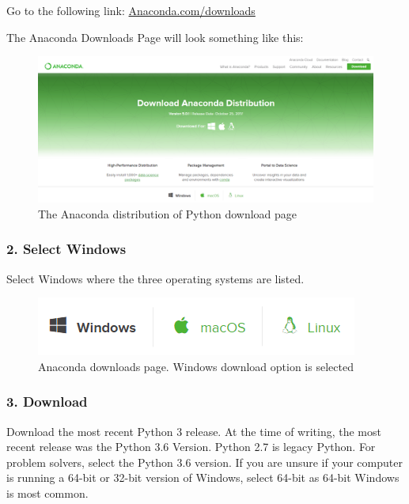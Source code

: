 \documentclass{book}
\makeatletter
\def\maxwidth{\ifdim\Gin@nat@width>\linewidth\linewidth
    \else\Gin@nat@width\fi}
\let\Oldincludegraphics\includegraphics
\renewcommand{\includegraphics}[1]{\Oldincludegraphics[width=.8\maxwidth]{#1}}
\makeatother
\begin{document}
Go to the following link:
\href{https://www.anaconda.com/download/}{Anaconda.com/downloads}

The Anaconda Downloads Page will look something like this:

\begin{figure}
\centering
\includegraphics{images/anaconda_download_page.png}
\caption{The Anaconda distribution of Python download page}
\end{figure}
    




    
        \subsubsection{2. Select Windows}\label{select-windows}

Select Windows where the three operating systems are listed.

\begin{figure}
\centering
\includegraphics{images/anaconda_select_windows.png}
\caption{Anaconda downloads page. Windows download option is selected}
\end{figure}
    




    
        \subsubsection{3. Download}\label{download}

Download the most recent Python 3 release. At the time of writing, the
most recent release was the Python 3.6 Version. Python 2.7 is legacy
Python. For problem solvers, select the Python 3.6 version. If you are
unsure if your computer is running a 64-bit or 32-bit version of
Windows, select 64-bit as 64-bit Windows is most common.
\end{document}
